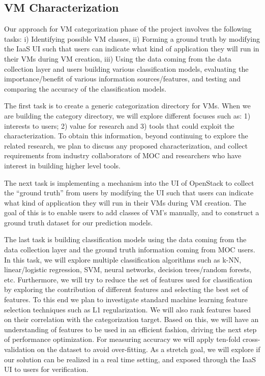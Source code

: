 \subsection{VM Characterization}

Our approach for VM categorization phase of the project involves the following tasks: i) Identifying possible VM classes, ii) Forming a ground truth by modifying the IaaS UI such that users can indicate what kind of application they will run in their VMs during VM creation, iii) Using the data coming from the data collection layer and users building various classification models, evaluating the importance/benefit of various information sources/features, and testing and comparing the accuracy of the classification models.  

The first task is to create a generic categorization directory for VMs. When we are building the category directory, we will explore different focuses such as: 1) interests to users; 2) value for research and 3) tools that could exploit the characterization. To obtain this information, beyond continuing to explore the related research, we plan to discuss any proposed characterization, and collect requirements from industry collaborators of MOC and researchers who have interest in building higher level tools. 

The next task is implementing a mechanism into the UI of OpenStack to collect the ``ground truth'' from users by modifying the UI such that users can indicate what kind of application they will run in their VMs during VM creation. The goal of this is to enable users to add classes of VM's manually, and to construct a ground truth dataset for our prediction models.

The last task is building classification models using the data coming from the data collection layer and the ground truth information coming from MOC users. In this task, we will explore multiple classification algorithms such as k-NN, linear/logistic regression, SVM, neural networks, decision trees/random forests, etc. Furthermore, we will try to reduce the set of features used for classification by exploring the contribution of different features and selecting the best set of features. To this end we plan to investigate standard machine learning feature selection techniques such as L1 regularization. We will also rank features based on their correlation with the categorization target. Based on this, we will have an understanding of features to be used in an efficient fashion, driving the next step of performance optimization. For measuring accuracy we will apply ten-fold cross-validation on the dataset to avoid over-fitting. As a stretch goal, we will explore if our solution can be realized in a real time setting, and exposed through the IaaS UI to users for verification.
